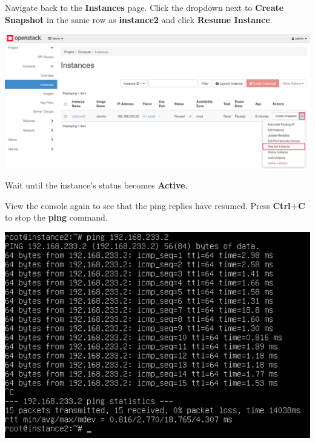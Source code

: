 \documentclass[letterpaper, 12pt]{article}
\begin{document}
\begin{enumerate}
    \begin{labstep}
        Navigate back to the \textbf{Instances} page.
        Click the dropdown next to \textbf{Create Snapshot} in the same row as \textbf{instance2} and click \textbf{Resume Instance}.

        \begin{center}
            \includegraphics[width=\linewidth]{images/part3/step10.png}
        \end{center}
    \end{labstep}

    \begin{stopbox}
        Wait until the instance's status becomes \textbf{Active}.
    \end{stopbox}

    \begin{labstep}
        View the console again to see that the ping replies have resumed.
        Press \textbf{Ctrl+C} to stop the \textbf{ping} command.

        \begin{center}
            \includegraphics[width=\linewidth]{images/part3/step11.png}
        \end{center}
    \end{labstep}


\end{enumerate}
\end{document}
